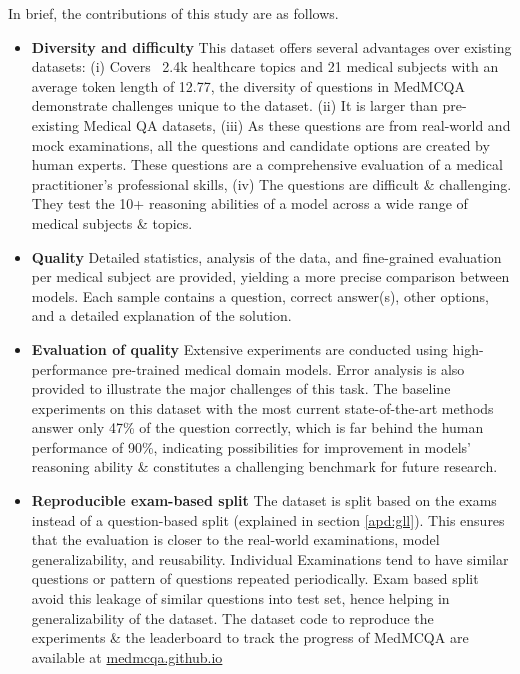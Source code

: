 \documentclass[pmlr,twocolumn,10pt]{jmlr}
\begin{document}
In brief, the contributions of this study are as follows.


\begin{itemize}
    \item \textbf{Diversity and difficulty} This dataset offers several advantages over existing datasets: (i) Covers ~2.4k healthcare topics and 21 medical subjects with an average token length of 12.77, the diversity of questions in MedMCQA demonstrate challenges unique to the dataset. (ii) It is larger than pre-existing Medical QA datasets, (iii) As these questions are from real-world and mock examinations, all the questions and candidate options are created by human experts. These questions are a comprehensive evaluation of a medical practitioner's professional skills, (iv) The questions are difficult \& challenging. They test the 10+ reasoning abilities of a model across a wide range of medical subjects \& topics.
    
    \item \textbf{Quality} Detailed statistics, analysis of the data, and fine-grained evaluation per medical subject are provided, yielding a more precise comparison between models. Each sample contains a question, correct answer(s), other options, and a detailed explanation of the solution.
    \item \textbf{Evaluation of quality} Extensive experiments are conducted using high-performance pre-trained medical domain models. Error analysis is also provided to illustrate the major challenges of this task. The baseline experiments on this dataset with the most current state-of-the-art methods answer only 47\% of the question correctly, which is far behind the human performance of 90\%, indicating possibilities for improvement in models' reasoning ability \& constitutes a challenging benchmark for future research.

    \item \textbf{Reproducible exam-based split} The dataset is split based on the exams instead of a question-based split (explained in section \ref{apd:gll}). This ensures that the evaluation is closer to the real-world examinations, model generalizability, and reusability. Individual Examinations tend to have similar questions or pattern of questions repeated periodically. Exam based split avoid this leakage of similar questions into test set, hence helping in generalizability of the dataset. The dataset code to reproduce the experiments \& the leaderboard to track the progress of MedMCQA are available at \url{medmcqa.github.io}
    

\end{itemize}
\end{document}
